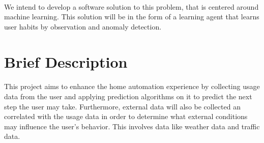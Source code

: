 \paragraph{}
We intend to develop a software solution to this problem, that is centered around machine learning. This solution will be in the form of a learning agent that learns user habits by observation and anomaly detection.

\section{Brief Description}
\paragraph{}
This project aims to enhance the home automation experience by collecting usage data from the user and applying prediction algorithms on it to predict the next step the user may take. Furthermore, external data will also be collected an correlated with the usage data in order to determine what external conditions may influence the user's behavior. This involves data like weather data and traffic data.

